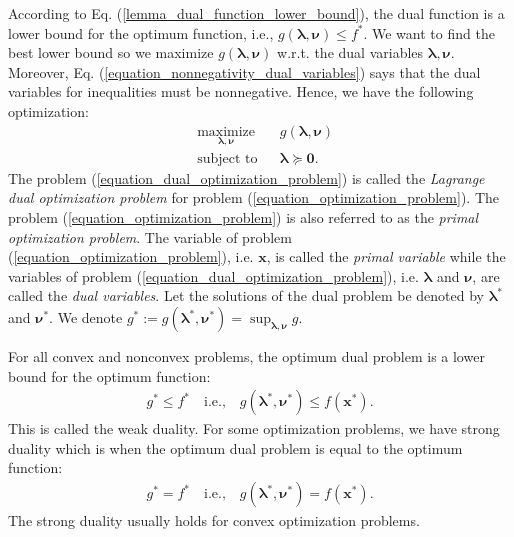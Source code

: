 \documentclass[lang=cn,10pt]{gorgeousnbook}
\numberwithin{equation}{section}%
\numberwithin{figure}{section}%
\begin{document}
According to Eq. (\ref{lemma_dual_function_lower_bound}), the dual function is a lower bound for the optimum function, i.e., $g(\boldsymbol{\lambda}, \boldsymbol{\nu}) \leq f^*$. We want to find the best lower bound so we maximize $g(\boldsymbol{\lambda}, \boldsymbol{\nu})$ w.r.t. the dual variables $\boldsymbol{\lambda}, \boldsymbol{\nu}$. Moreover, Eq. (\ref{equation_nonnegativity_dual_variables}) says that the dual variables for inequalities must be nonnegative. Hence, we have the following optimization:
\begin{equation}\label{equation_dual_optimization_problem}
\begin{aligned}
& \underset{\boldsymbol{\lambda}, \boldsymbol{\nu}}{\text{maximize}}
& & g(\boldsymbol{\lambda}, \boldsymbol{\nu}) \\
& \text{subject to}
& & \boldsymbol{\lambda} \succeq \boldsymbol{0}. 
\end{aligned}
\end{equation}
The problem (\ref{equation_dual_optimization_problem}) is called the \textit{Lagrange dual optimization problem} for problem (\ref{equation_optimization_problem}). The problem (\ref{equation_optimization_problem}) is also referred to as the \textit{primal optimization problem}.
The variable of problem (\ref{equation_optimization_problem}), i.e. $\boldsymbol{x}$, is called the \textit{primal variable} while the variables of problem (\ref{equation_dual_optimization_problem}), i.e. $\boldsymbol{\lambda}$ and $\boldsymbol{\nu}$, are called the \textit{dual variables}. 
Let the solutions of the dual problem be denoted by $\boldsymbol{\lambda}^*$ and $\boldsymbol{\nu}^*$. We denote $g^* := g(\boldsymbol{\lambda}^*, \boldsymbol{\nu}^*) = \sup_{\boldsymbol{\lambda}, \boldsymbol{\nu}} g$. 

\begin{definition}
For all convex and nonconvex problems, the optimum dual problem is a lower bound for the optimum function:
\begin{align}\label{equation_weak_duality}
g^* \leq f^* \quad \text{i.e.,} \quad g(\boldsymbol{\lambda}^*, \boldsymbol{\nu}^*) \leq f(\boldsymbol{x}^*).
\end{align}
This is called the weak duality. 
For some optimization problems, we have strong duality which is when the optimum dual problem is equal to the optimum function:
\begin{align}\label{equation_strong_duality}
g^* = f^* \quad \text{i.e.,} \quad g(\boldsymbol{\lambda}^*, \boldsymbol{\nu}^*) = f(\boldsymbol{x}^*).
\end{align}
The strong duality usually holds for convex optimization problems. 
\end{definition}
\end{document}
